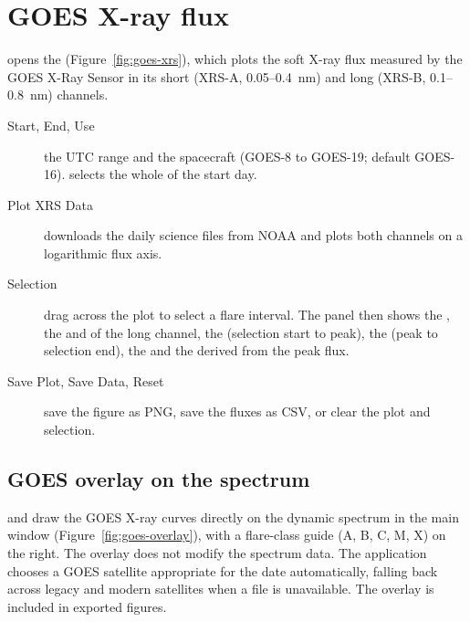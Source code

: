 \section{GOES X-ray flux}
\label{sec:goes-xrs}

 opens the 
(Figure~\ref{fig:goes-xrs}), which plots the soft X-ray flux measured by the GOES X-Ray
Sensor in its short (XRS-A, 0.05--0.4~nm) and long (XRS-B, 0.1--0.8~nm) channels.


\begin{description}
  \item[Start, End, Use] the UTC range and the spacecraft (GOES-8 to GOES-19; default
    GOES-16).  selects the whole of the start day.
  \item[Plot XRS Data] downloads the daily science files from NOAA and plots both channels
    on a logarithmic flux axis.
  \item[Selection] drag across the plot to select a flare interval. The
     panel then shows the , the
     and  of the long channel, the
     (selection start to peak), the  (peak to selection end),
    the  and the  derived from the peak flux.
  \item[Save Plot, Save Data, Reset] save the figure as PNG, save the fluxes as CSV, or clear
    the plot and selection.
\end{description}

\subsection{GOES overlay on the spectrum}
\label{sec:goes-overlay}

 and  draw the GOES
X-ray curves directly on the dynamic spectrum in the main window
(Figure~\ref{fig:goes-overlay}), with a flare-class guide (A, B, C, M, X) on the right. The
overlay does not modify the spectrum data. The application chooses a GOES satellite
appropriate for the date automatically, falling back across legacy and modern satellites
when a file is unavailable. The overlay is included in exported figures.

